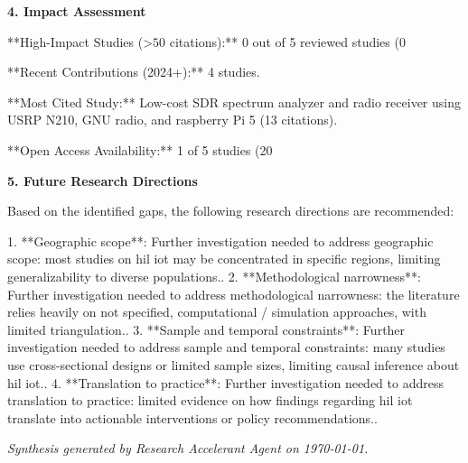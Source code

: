 \documentclass[11pt,a4paper]{article}
\begin{document}
\vspace{0.3em}


\vspace{1em}
\textbf{\large 4. Impact Assessment}\par\vspace{0.5em}

**High-Impact Studies (>$50$ citations):** 0 out of 5 reviewed studies (0%

**Recent Contributions (2024+):** 4 studies.

**Most Cited Study:** Low-cost SDR spectrum analyzer and radio receiver using USRP N210, GNU radio, and raspberry Pi 5 (13 citations).

**Open Access Availability:** 1 of 5 studies (20%

\vspace{1em}


\textbf{\large 5. Future Research Directions}\par\vspace{0.5em}

Based on the identified gaps, the following research directions are recommended:

1. **Geographic scope**: Further investigation needed to address geographic scope: most studies on hil iot may be concentrated in specific regions, limiting generalizability to diverse populations..
2. **Methodological narrowness**: Further investigation needed to address methodological narrowness: the literature relies heavily on not specified, computational / simulation approaches, with limited triangulation..
3. **Sample and temporal constraints**: Further investigation needed to address sample and temporal constraints: many studies use cross-sectional designs or limited sample sizes, limiting causal inference about hil iot..
4. **Translation to practice**: Further investigation needed to address translation to practice: limited evidence on how findings regarding hil iot translate into actionable interventions or policy recommendations..

\vspace{1em}


\vfill
\begin{center}
\textit{Synthesis generated by Research Accelerant Agent on \today.}
\end{center}
\end{document}
